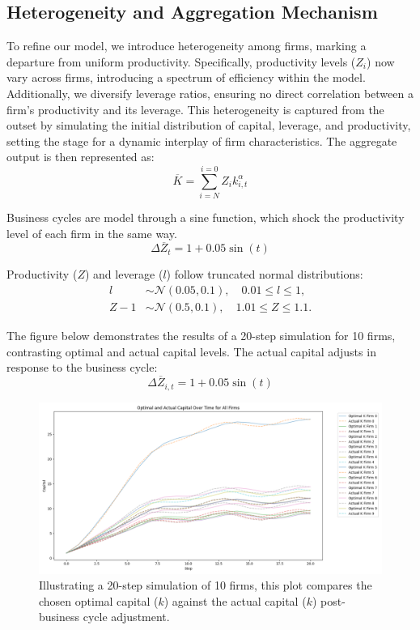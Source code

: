 \documentclass[12pt]{report}
\begin{document}
\subsection{Heterogeneity and Aggregation Mechanism}

To refine our model, we introduce heterogeneity among firms, marking a departure from uniform productivity.  Specifically, productivity levels (\( Z_i \)) now vary across firms, introducing a spectrum of efficiency within
the model. Additionally, we diversify leverage ratios, ensuring no direct correlation between a firm's productivity and
its leverage. This heterogeneity is captured from the outset by simulating the initial distribution of capital,
leverage, and productivity, setting the stage for a dynamic interplay of firm characteristics. The aggregate output
is then represented as:
\[
\overline{K} = \sum_{i=N }^{i=0 }Z_i k_{i,t}^{\alpha}
\]

Business cycles are model through a sine function, which shock the productivity level of each firm in the same way.
\[
\Delta \overline{Z}_t = 1 + 0.05 \sin(t)
\]

Productivity (\( Z \)) and leverage (\( l \)) follow truncated normal distributions:
\begin{align}
    l &\sim \mathcal{N}(0.05, 0.1), \quad 0.01 \leq l \leq 1, \\
    Z-1 &\sim \mathcal{N}(0.5, 0.1), \quad 1.01 \leq Z \leq 1.1.
\end{align}

The figure below demonstrates the results of a 20-step simulation for 10 firms, contrasting optimal and actual capital
levels.  The actual capital adjusts in response to the business cycle:
\[
\Delta \overline{Z}_{i,t} = 1 + 0.05 \sin(t)
\]

\begin{figure}[H]
    \centering
    \includegraphics[scale=0.4]{figure/OptimalK_noexit.png}
    \caption{Illustrating a 20-step simulation of 10 firms, this plot compares the chosen optimal capital (\(k\))
    against the
     actual capital (\(k\)) post-business cycle adjustment.}
    \label{fig:optKnoE}
\end{figure}
\end{document}
